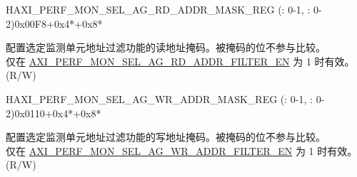 \begin{register}{H}{AXI\_PERF\_MON\_SEL\_AG\_RD\_ADDR\_MASK\_REG (: 0-1, : 0-2)}{0x00F8+0x4*+0x8*}\label{regdesc:AXIPERFMONSELAGNRDADDRMASKMREG}
%
\regnewline%
\begin{regdesc}\begin{reglist}
\label{fielddesc:AXIPERFMONSELAGNRDADDRMASKM}\item [AXI\_PERF\_MON\_SEL\_AG\regindex{n}\_RD\_ADDR\_MASK\regindex{m} (\regindex{n}: 0-1, \regindex{m}: 0-2)] 配置选定监测单元地址过滤功能的读地址掩码。被掩码的位不参与比较。\\
仅在 \hyperref[fielddesc:AXIPERFMONSELAGNRDADDRFILTEREN]{AXI\_PERF\_MON\_SEL\_AG\_RD\_ADDR\_FILTER\_EN} 为 1 时有效。\\
(R/W)
\end{reglist}\end{regdesc}
\end{register}


\begin{register}{H}{AXI\_PERF\_MON\_SEL\_AG\_WR\_ADDR\_MASK\_REG (: 0-1, : 0-2)}{0x0110+0x4*+0x8*}\label{regdesc:AXIPERFMONSELAGNWRADDRMASKMREG}
%
\regnewline%
\begin{regdesc}\begin{reglist}
\label{fielddesc:AXIPERFMONSELAGNWRADDRMASKM}\item [AXI\_PERF\_MON\_SEL\_AG\regindex{n}\_WR\_ADDR\_MASK\regindex{m} (\regindex{n}: 0-1, \regindex{m}: 0-2)] 配置选定监测单元地址过滤功能的写地址掩码。被掩码的位不参与比较。\\
仅在 \hyperref[fielddesc:AXIPERFMONSELAGNWRADDRFILTEREN]{AXI\_PERF\_MON\_SEL\_AG\_WR\_ADDR\_FILTER\_EN} 为 1 时有效。\\
(R/W)
\end{reglist}\end{regdesc}
\end{register}


